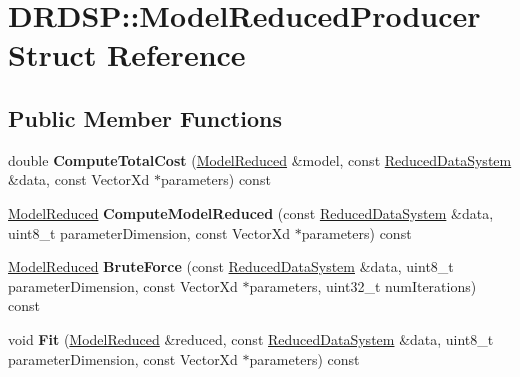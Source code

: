 \hypertarget{struct_d_r_d_s_p_1_1_model_reduced_producer}{\section{D\-R\-D\-S\-P\-:\-:Model\-Reduced\-Producer Struct Reference}
\label{struct_d_r_d_s_p_1_1_model_reduced_producer}
}
\subsection*{Public Member Functions}
\begin{DoxyCompactItemize}
\item 
\hypertarget{struct_d_r_d_s_p_1_1_model_reduced_producer_aef28bf6e7d463b6891a49be22e1a292f}{double {\bfseries Compute\-Total\-Cost} (\hyperlink{struct_d_r_d_s_p_1_1_model_reduced}{Model\-Reduced} \&model, const \hyperlink{struct_d_r_d_s_p_1_1_reduced_data_system}{Reduced\-Data\-System} \&data, const Vector\-Xd $\ast$parameters) const }\label{struct_d_r_d_s_p_1_1_model_reduced_producer_aef28bf6e7d463b6891a49be22e1a292f}

\item 
\hypertarget{struct_d_r_d_s_p_1_1_model_reduced_producer_a8c3f3e9c4261bb92362fa6bb41b9a0d4}{\hyperlink{struct_d_r_d_s_p_1_1_model_reduced}{Model\-Reduced} {\bfseries Compute\-Model\-Reduced} (const \hyperlink{struct_d_r_d_s_p_1_1_reduced_data_system}{Reduced\-Data\-System} \&data, uint8\-\_\-t parameter\-Dimension, const Vector\-Xd $\ast$parameters) const }\label{struct_d_r_d_s_p_1_1_model_reduced_producer_a8c3f3e9c4261bb92362fa6bb41b9a0d4}

\item 
\hypertarget{struct_d_r_d_s_p_1_1_model_reduced_producer_a509fca4a7d4fcf6c62edb061eaad6352}{\hyperlink{struct_d_r_d_s_p_1_1_model_reduced}{Model\-Reduced} {\bfseries Brute\-Force} (const \hyperlink{struct_d_r_d_s_p_1_1_reduced_data_system}{Reduced\-Data\-System} \&data, uint8\-\_\-t parameter\-Dimension, const Vector\-Xd $\ast$parameters, uint32\-\_\-t num\-Iterations) const }\label{struct_d_r_d_s_p_1_1_model_reduced_producer_a509fca4a7d4fcf6c62edb061eaad6352}

\item 
\hypertarget{struct_d_r_d_s_p_1_1_model_reduced_producer_aee82ad4aa16823c53056004a0c6f035e}{void {\bfseries Fit} (\hyperlink{struct_d_r_d_s_p_1_1_model_reduced}{Model\-Reduced} \&reduced, const \hyperlink{struct_d_r_d_s_p_1_1_reduced_data_system}{Reduced\-Data\-System} \&data, uint8\-\_\-t parameter\-Dimension, const Vector\-Xd $\ast$parameters) const }\label{struct_d_r_d_s_p_1_1_model_reduced_producer_aee82ad4aa16823c53056004a0c6f035e}

\end{DoxyCompactItemize}
